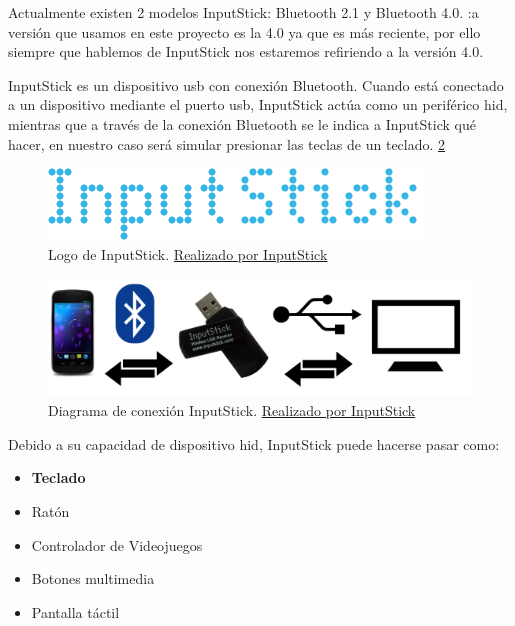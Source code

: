 Actualmente existen 2 modelos InputStick: Bluetooth 2.1 y Bluetooth 4.0.\cite{stickversions} :a versión que usamos en este proyecto es la 4.0 ya que es más reciente, por ello siempre que hablemos de InputStick nos estaremos refiriendo a la versión 4.0.

InputStick es un dispositivo \gls{usb} con conexión Bluetooth. Cuando está conectado a un dispositivo mediante el puerto \gls{usb}, InputStick actúa como un periférico \gls{hid}, mientras que a través de la conexión Bluetooth se le indica a InputStick qué hacer, en nuestro caso será simular presionar las teclas de un teclado. \ref{fig:inputstick-diagram} \cite{stickworks}

\begin{figure}[H]
    \centering
    \includegraphics[width=\textwidth]{gfx/inputstick-logo.png}
    \caption{Logo de InputStick. \href{http://inputstick.com/}{Realizado por InputStick}}
    \label{fig:inputstick-logo}
\end{figure}

\begin{figure}[H]
    \centering
    \includegraphics[width=\textwidth]{gfx/inputstick-diagram.png}
    \caption{Diagrama  de conexión InputStick. \href{http://inputstick.com/how-it-works/}{Realizado por InputStick}}
    \label{fig:inputstick-diagram}
\end{figure}
Debido a su capacidad de dispositivo \gls{hid}, InputStick puede hacerse pasar como:
\begin{itemize}
    \item \textbf{Teclado}
    \item Ratón
    \item Controlador de Videojuegos
    \item Botones multimedia
    \item Pantalla táctil
\end{itemize}

